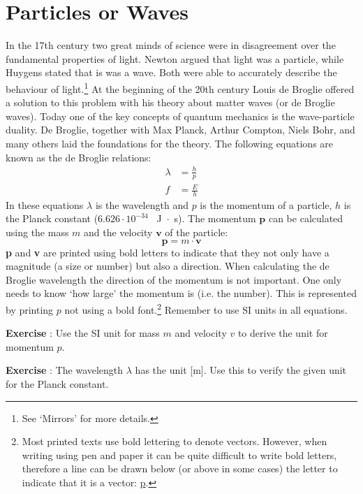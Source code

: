 \section{Particles or Waves}
In the 17th century two great minds of science were in disagreement over the fundamental properties of light. Newton argued that light was a particle, while Huygens stated that is was a wave. Both were able to accurately describe the behaviour of light.\footnote{See `Mirrors' for more details.} At the beginning of the 20th century Louis de Broglie offered a solution to this problem with his theory about matter waves (or de Broglie waves). Today one of the key concepts of quantum mechanics is the wave-particle duality. De Broglie, together with Max Planck, Arthur Compton, Niels Bohr, and many others laid the foundations for the theory.
The following equations are known as the de Broglie relations:
\begin{align}
\lambda &= \frac{h}{p} \label{eq:broglie_1} \\ 
f &= \frac{E}{h} \label{eq:broglie_2}
\end{align}
In these equations $\lambda$ is the wavelength and $p$ is the momentum of a particle, $h$ is the Planck constant ($6.626 \cdot 10^{-34}$ ~J~$\cdot$~s). The momentum $\textbf{p}$ can be calculated using the mass $m$ and the velocity $\textbf{v}$ of the particle:
\begin{equation}
\textbf{p}= m \cdot \textbf{v} \label{eq:momentum} 
\end{equation}
\textbf{p} and \textbf{v} are printed using bold letters to indicate that they not only have a magnitude (a size or number) but also a direction. When calculating the de Broglie wavelength the direction of the momentum is not important. One only needs to know `how large' the momentum is (i.e. the number). This is represented by printing $p$ not using a bold font.\footnote{Most printed texts use bold lettering to denote vectors. However, when writing using pen and paper it can be quite difficult to write bold letters, therefore a line can be drawn below (or above in some cases) the letter to indicate that it is a vector: \underline{p}.} Remember to use SI units in all equations.

\begin{shaded} \textbf{Exercise \theExercise {}} : Use the SI unit for mass $m$ and velocity $v$ to derive the unit for momentum $p$. \end{shaded}
\begin{shaded} \textbf{Exercise \theExercise {}} : The wavelength $\lambda$ has the unit [m]. Use this to verify the given unit for the Planck constant. \end{shaded}

